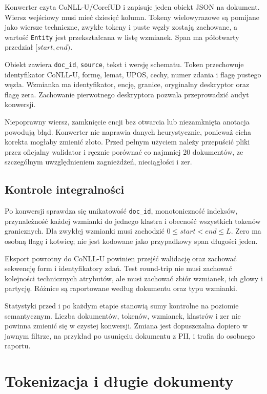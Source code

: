 Konwerter czyta CoNLL-U/CorefUD i zapisuje jeden obiekt JSON na dokument. Wiersz wejściowy musi mieć dziesięć kolumn. Tokeny wielowyrazowe są pomijane jako wiersze techniczne, zwykłe tokeny i puste węzły zostają zachowane, a wartość \texttt{Entity} jest przekształcana w listę wzmianek. Span ma półotwarty przedział $[start,end)$.

Obiekt zawiera \texttt{doc\_id}, \texttt{source}, tekst i wersję schematu. Token przechowuje identyfikator CoNLL-U, formę, lemat, UPOS, cechy, numer zdania i flagę pustego węzła. Wzmianka ma identyfikator, encję, granice, oryginalny deskryptor oraz flagę zera. Zachowanie pierwotnego deskryptora pozwala przeprowadzić audyt konwersji.

Niepoprawny wiersz, zamknięcie encji bez otwarcia lub niezamknięta anotacja powodują błąd. Konwerter nie naprawia danych heurystycznie, ponieważ cicha korekta mogłaby zmienić złoto. Przed pełnym użyciem należy przepuścić pliki przez oficjalny walidator i ręcznie porównać co najmniej 20 dokumentów, ze szczególnym uwzględnieniem zagnieżdżeń, nieciągłości i zer.

\subsection{Kontrole integralności}

Po konwersji sprawdza się unikatowość \texttt{doc\_id}, monotoniczność indeksów, przynależność każdej wzmianki do jednego klastra i obecność wszystkich tokenów granicznych. Dla zwykłej wzmianki musi zachodzić $0\leq start<end\leq L$. Zero ma osobną flagę i kotwicę; nie jest kodowane jako przypadkowy span długości jeden.

Eksport powrotny do CoNLL-U powinien przejść walidację oraz zachować sekwencję form i identyfikatory zdań. Test round-trip nie musi zachować kolejności technicznych atrybutów, ale musi zachować zbiór wzmianek, ich głowy i partycję. Różnice są raportowane według dokumentu oraz typu wzmianki.

Statystyki przed i po każdym etapie stanowią sumy kontrolne na poziomie semantycznym. Liczba dokumentów, tokenów, wzmianek, klastrów i zer nie powinna zmienić się w czystej konwersji. Zmiana jest dopuszczalna dopiero w jawnym filtrze, na przykład po usunięciu dokumentu z PII, i trafia do osobnego raportu.

\section{Tokenizacja i długie dokumenty}
\label{sec:okna-danych}

